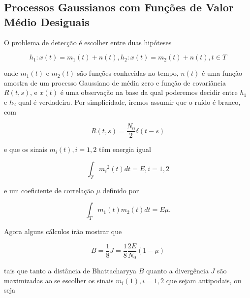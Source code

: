 \documentclass{sbrt2017port}
\begin{document}
\subsection{Processos Gaussianos com Funções de Valor Médio Desiguais}

O problema de detecção é escolher entre duas hipóteses

$$ h_1:x(t) = m_1(t) + n(t), h_2:x(t) = m_2(t) + n(t), t \in T$$

onde $m_1(t)$ e $m_2(t)$ são funções conhecidas no tempo, $n(t)$ é uma função amostra de um processo Gaussiano de média zero e função de covariância $R(t,s)$, e $x(t)$ é uma observação na base da qual poderemos decidir entre $h_1$ e $h_2$ qual é verdadeira. Por simplicidade, iremos assumir que o ruído é branco, com

$$ R(t,s) = \frac{N_0}{2}\delta(t-s) $$

e que os sinais $m_i(t), i=1,2$ têm energia igual

\begin{equation}
 \int_{T}^{} {m_i}^2(t)dt = E, i=1,2
 \label{eq12}
\end{equation}

e um coeficiente de correlação $\mu$ definido por

\begin{equation}
 \int_{T}^{} m_1(t)m_2(t)dt = E\mu.
 \label{eq13}
\end{equation}

Agora alguns cálculos irão mostrar que

\begin{equation}
 B = \frac{1}{8}J=\frac{1}{8}\frac{2E}{N_0}(1-\mu)
 \label{eq14}
\end{equation}

tais que tanto a distância de Bhattacharyya $B$ quanto a divergência $J$ são maximizadas ao se escolher os sinais $m_i(1), i=1,2$ que sejam antipodais, ou seja
\end{document}
